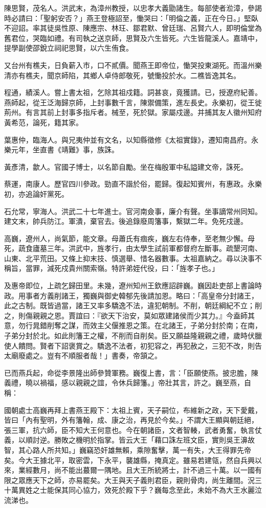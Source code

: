 \begin{pinyinscope}
陳思賢，茂名人。洪武末，為漳州教授，以忠孝大義勖諸生。每部使者涖漳，參謁時必請曰：「聖躬安否？」燕王登極詔至，慟哭曰：「明倫之義，正在今日。」堅臥不迎詔。率其徒吳性原、陳應宗、林玨、鄒君默、曾廷瑞、呂賢六人，即明倫堂為舊君位，哭臨如禮。有司執之送京師，思賢及六生皆死。六生皆龍溪人。嘉靖中，提學副使邵銳立祠祀思賢，以六生侑食。

又台州有樵夫，日負薪入市，口不貳價。聞燕王即帝位，慟哭投東湖死。而溫州樂清亦有樵夫，聞京師陷，其鄉人卓侍郎敬死，號慟投於水。二樵皆逸其名。

程通，績溪人。嘗上書太祖，乞除其祖戍籍。詞甚哀，竟獲請。已，授遼府紀善。燕師起，從王泛海歸京師，上封事數千言，陳禦備策，進左長史。永樂初，從王徙荊州。有言其前上封事多指斥者。械至，死於獄。家屬戍邊。并捕其友人徽州知府黃希范，論死，籍其家。

葉惠仲，臨海人。與兄夷仲並有文名，以知縣徵修《太祖實錄》，遷知南昌府。永樂元年，坐直書《靖難》事，族誅。

黃彥清，歙人。官國子博士，以名節自勵。坐在梅殷軍中私謚建文帝，誅死。

蔡運，南康人。歷官四川參政。勁直不諧於俗，罷歸。復起知賓州，有惠政。永樂初，亦追論奸黨死。

石允常，寧海人。洪武二十七年進士。官河南僉事，廉介有聲。坐事謫常州同知。建文末，帥兵防江。軍潰，棄官去。後追錄廢周籓事，繫獄二年。免死戍邊。

高巍，遼州人，尚氣節，能文章。母蕭氏有痼疾，巍左右侍奉，至老無少懈。母死，蔬食廬墓三年。洪武中，旌孝行，由太學生試前軍都督府左斷事。疏墾河南、山東、北平荒田。又條上抑末技、慎選舉、惜名器數事。太祖嘉納之。尋以決事不稱旨，當罪，減死戍貴州關索嶺。特許弟姪代役，曰：「旌孝子也。」

及惠帝即位，上疏乞歸田里。未幾，遼州知州王欽應詔辟巍。巍因赴吏部上書論時政。用事者方義削諸王，獨巍與御史韓郁先後請加恩。略曰：「高皇帝分封諸王，此之古制。既皆過當，諸王又率多驕逸不法，違犯朝制。不削，朝廷綱紀不立；削之，則傷親親之恩。賈誼曰：『欲天下治安，莫如眾建諸侯而少其力。』今盍師其意，勿行晁錯削奪之謀，而效主父偃推恩之策。在北諸王，子弟分封於南；在南，子弟分封於北。如此則籓王之權，不削而自削矣。臣又願益隆親親之禮，歲時伏臘使人饋問。賢者下詔褒賞之。驕逸不法者，初犯容之，再犯赦之，三犯不改，則告太廟廢處之。豈有不順服者哉！」書奏，帝頷之。

已而燕兵起，命從李景隆出師參贊軍務。巍復上書，言：「臣願使燕。披忠膽，陳義禮，曉以禍福，感以親親之誼，令休兵歸籓。」帝壯其言，許之。巍至燕，自稱：

國朝處士高巍再拜上書燕王殿下：太祖上賓，天子嗣位，布維新之政，天下愛戴，皆曰「內有聖明，外有籓翰，成、康之治，再見於今矣。」不謂大王顯與朝廷絕，張三軍，抗六師，臣不知大王何意也。今在朝諸臣，文者智輳，武者勇奮，執言仗義，以順討逆。勝敗之機明於指掌。皆云大王「藉口誅左班文臣，實則吳王濞故智，其心路人所共知。」巍竊恐奸雄無賴，乘隙奮擊，萬一有失，大王得罪先帝矣。今大王據北平，取密雲，下永平，襲雄縣，掩真定。雖易若建瓴，然自兵興以來，業經數月，尚不能出蕞爾一隅地。且大王所統將士，計不過三十萬。以一國有限之眾應天下之師，亦易罷矣。大王與天子義則君臣，親則骨肉，尚生離間。況三十萬異姓之士能保其同心協力，效死於殿下乎？巍每念至此，未始不為大王水麗泣流涕也。


\end{pinyinscope}
